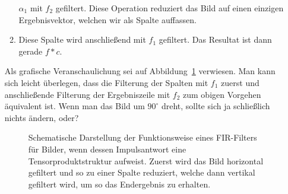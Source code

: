 \begin{remark}
\begin{itemize}
\begin{enumerate}
    $ \alpha_{1} $ mit $ f_{2} $ gefiltert. Diese Operation reduziert das Bild auf einen
    einzigen Ergebnisvektor, welchen wir als Spalte auffassen.
  \item Diese Spalte wird anschließend mit $ f_{1} $ gefiltert. Das Resultat ist dann gerade 
    $ f * c $.
  \end{enumerate}
  Als grafische Veranschaulichung sei auf Abbildung~\ref{fig:FIR-Filter-2D} verwiesen. Man kann
  sich leicht überlegen, dass die Filterung der Spalten mit $ f_{1} $ zuerst und anschließende
  Filterung der Ergebniszeile mit $ f_{2} $ zum obigen Vorgehen äquivalent ist. Wenn man das Bild um
  $ 90^{\circ} $ dreht, sollte sich ja schließlich nichts ändern, oder?
  \begin{figure}[ht]
  \centering
  \caption{Schematische Darstellung der Funktionsweise eines FIR-Filters für Bilder, wenn dessen
    Impulsantwort eine Tensorproduktstruktur aufweist. Zuerst wird das Bild horizontal gefiltert
    und so zu einer Spalte reduziert, welche dann vertikal gefiltert wird, um so das Endergebnis zu
    erhalten.}
  \label{fig:FIR-Filter-2D}
  \end{figure}
  

\end{itemize}
\end{remark}
